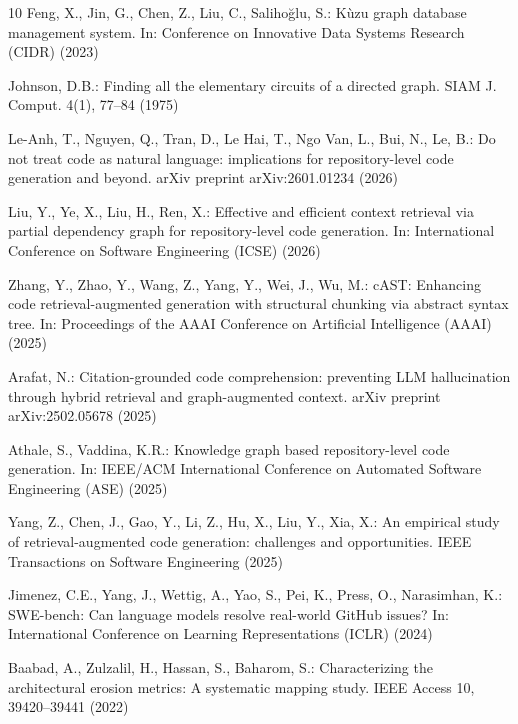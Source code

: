 \documentclass[runningheads]{llncs}
\begin{document}
\begin{thebibliography}{10}
Feng, X., Jin, G., Chen, Z., Liu, C., Saliho{\u{g}}lu, S.: K{\`u}zu graph database management system. In: Conference on Innovative Data Systems Research (CIDR) (2023)

Johnson, D.B.: Finding all the elementary circuits of a directed graph. SIAM J. Comput. 4(1), 77--84 (1975)

Le-Anh, T., Nguyen, Q., Tran, D., Le Hai, T., Ngo Van, L., Bui, N., Le, B.: Do not treat code as natural language: implications for repository-level code generation and beyond. arXiv preprint arXiv:2601.01234 (2026)

Liu, Y., Ye, X., Liu, H., Ren, X.: Effective and efficient context retrieval via partial dependency graph for repository-level code generation. In: International Conference on Software Engineering (ICSE) (2026)

Zhang, Y., Zhao, Y., Wang, Z., Yang, Y., Wei, J., Wu, M.: cAST: Enhancing code retrieval-augmented generation with structural chunking via abstract syntax tree. In: Proceedings of the AAAI Conference on Artificial Intelligence (AAAI) (2025)

Arafat, N.: Citation-grounded code comprehension: preventing LLM hallucination through hybrid retrieval and graph-augmented context. arXiv preprint arXiv:2502.05678 (2025)

Athale, S., Vaddina, K.R.: Knowledge graph based repository-level code generation. In: IEEE/ACM International Conference on Automated Software Engineering (ASE) (2025)

Yang, Z., Chen, J., Gao, Y., Li, Z., Hu, X., Liu, Y., Xia, X.: An empirical study of retrieval-augmented code generation: challenges and opportunities. IEEE Transactions on Software Engineering (2025)

Jimenez, C.E., Yang, J., Wettig, A., Yao, S., Pei, K., Press, O., Narasimhan, K.: SWE-bench: Can language models resolve real-world GitHub issues? In: International Conference on Learning Representations (ICLR) (2024)

Baabad, A., Zulzalil, H., Hassan, S., Baharom, S.: Characterizing the architectural erosion metrics: A systematic mapping study. IEEE Access 10, 39420--39441 (2022)

\end{thebibliography}
\end{document}
